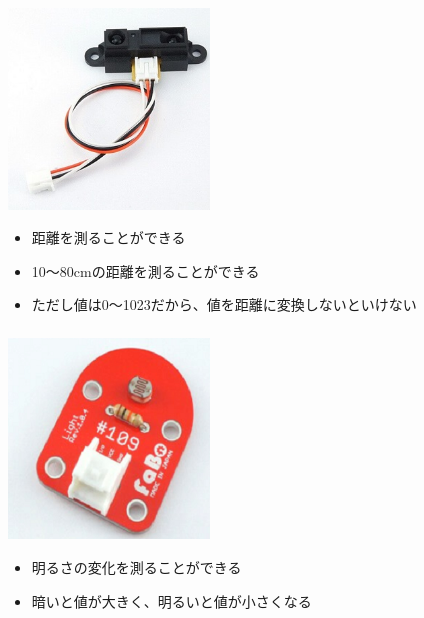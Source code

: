 \begin{frame}
    \frametitle{}
    \begin{center}
        \includegraphics[width=0.4\textwidth]{images/chap05/text05-img023.jpg}
        \begin{itemize}
            \item 距離を測ることができる
            \item 10〜80cmの距離を測ることができる
            \item ただし値は0〜1023だから、値を距離に変換しないといけない
        \end{itemize}
    \end{center}
\end{frame}

\begin{frame}
    \frametitle{}
    \begin{center}
        \includegraphics[width=0.4\textwidth]{images/chap05/text05-img024.png}
        \begin{itemize}
            \item 明るさの変化を測ることができる
            \item 暗いと値が大きく、明るいと値が小さくなる
        \end{itemize}
    \end{center}
\end{frame}

